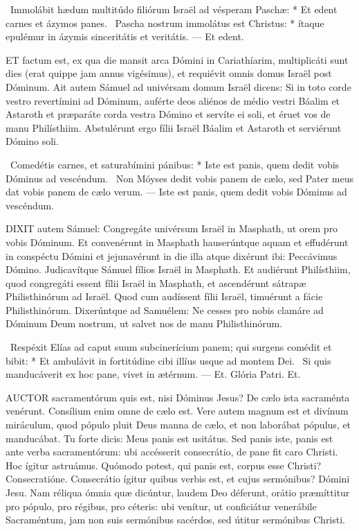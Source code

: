 \R\ Immolábit hædum multitúdo filiórum Israël ad vésperam Paschæ: * Et edent carnes et ázymos panes. \V\ Pascha nostrum immolátus est Christus: * ítaque epulémur in ázymis sinceritátis et veritátis. --- Et edent.


\lettrine[lines=2]{E}{T} factum est, ex qua die mansit arca Dómini in Cariathíarim, multiplicáti sunt dies (erat quippe jam annus vigésimus), et requiévit omnis domus Israël post Dóminum. Ait autem Sámuel ad univérsam domum Israël dicens: Si in toto corde vestro revertímini ad Dóminum, auférte deos aliénos de médio vestri Báalim et Astaroth et præparáte corda vestra Dómino et servíte ei soli, et éruet vos de manu Philísthiim. Abstulérunt ergo fílii Israël Báalim et Astaroth et serviérunt Dómino soli.

\R\ Comedétis carnes, et saturabímini pánibus: * Iste est panis, quem dedit vobis Dóminus ad vescéndum. \V\ Non Móyses dedit vobis panem de cælo, sed Pater meus dat vobis panem de cælo verum. --- Iste est panis, quem dedit vobis Dóminus ad vescéndum.


\lettrine[lines=2]{D}{IXIT} autem Sámuel: Congregáte univérsum Israël in Masphath, ut orem pro vobis Dóminum. Et convenérunt in Masphath hauserúntque aquam et effudérunt in conspéctu Dómini et jejunavérunt in die illa atque dixérunt ibi: Peccávimus Dómino. Judicavítque Sámuel fílios Israël in Masphath. Et audiérunt Philísthiim, quod congregáti essent fílii Israël in Masphath, et ascendérunt sátrapæ Philisthinórum ad Israël. Quod cum audíssent fílii Israël, timuérunt a fácie Philisthinórum. Dixerúntque ad Samuélem: Ne cesses pro nobis clamáre ad Dóminum Deum nostrum, ut salvet nos de manu Philisthinórum.

\R\ Respéxit Elías ad caput suum subcinerícium panem; qui surgens comédit et bibit: * Et ambulávit in fortitúdine cibi illíus usque ad montem Dei. \V\ Si quis manducáverit ex hoc pane, vivet in ætérnum. --- Et. Glória Patri. Et.





\lettrine[lines=2]{A}{UCTOR} sacramentórum quis est, nisi Dóminus Jesus? De cælo ista sacraménta venérunt. Consílium enim omne de cælo est. Vere autem magnum est et divínum miráculum, quod pópulo pluit Deus manna de cælo, et non laborábat pópulus, et manducábat. Tu forte dicis: Meus panis est usitátus. Sed panis iste, panis est ante verba sacramentórum: ubi accésserit consecrátio, de pane fit caro Christi. Hoc ígitur astruámus. Quómodo potest, qui panis est, corpus esse Christi? Consecratióne. Consecrátio ígitur quibus verbis est, et cujus sermónibus? Dómini Jesu. Nam réliqua ómnia quæ dicúntur, laudem Deo déferunt, orátio præmíttitur pro pópulo, pro régibus, pro céteris: ubi venítur, ut conficiátur venerábile Sacraméntum, jam non suis sermónibus sacérdos, sed útitur sermónibus Christi.

